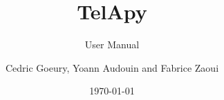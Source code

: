 \documentclass[TelApy]{../../data/TelemacDoc} %
\begin{document}
\let\cleardoublepage\clearpage

\title{TelApy}
\subtitle{User Manual}
\version{\telmaversion}
\author{Cedric Goeury, Yoann Audouin and Fabrice Zaoui}
\date{\today}
\maketitle
\clearpage



\newpage

\thispagestyle{empty}

\TelemacCopyright{}




\pagestyle{empty} %

\tableofcontents%


\pagestyle{fancy} %



%





\end{document}
